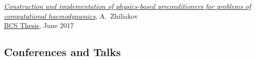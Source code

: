 \documentclass[a4paper,12pt]{article}
\begin{document}
\begin{etaremune}[topsep=0pt]
		\item \textit{\href{https://www.researchgate.net/publication/318039077_Postroenie_i_realizacia_fiziceskih_pereobuslavlivatelej_dla_zadac_vycislitelnoj_gemodinamiki}{Construction and implementation of physics-based preconditioners for problems of computational haemodynamics}}, A.~Zhiliakov\\ \href{https://elibrary.nstu.ru/source?id=61216}{BCS Thesis}, June 2017   
%			
%			
	\end{etaremune}

	\subsection*{Conferences and Talks}
	
\end{document}
